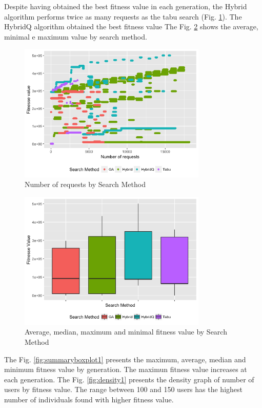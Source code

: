 Despite having obtained the best fitness value in each generation, the Hybrid algorithm performs twice as many requests as the  tabu search (Fig. \ref{fig:numberofrequestsbysearchmethod}). The HybridQ algorithm obtained the best fitness value The Fig. \ref{fig:boxplot1} shows the average, minimal e maximum value by search method.


\begin{figure}[H]

\centering
\includegraphics[width=0.8\textwidth]{./images/experiment1-3.png}
\caption{Number of requests by Search Method}
\label{fig:numberofrequestsbysearchmethod}
\end{figure}
\begin{figure}[H]
\centering
\includegraphics[width=0.8\textwidth]{./images/experiment1-4.png}
\caption{Average, median, maximum and minimal fitness value by Search Method}
\label{fig:boxplot1}

\end{figure}

The Fig. \ref{fig:summaryboxplot1} presents the maximum, average, median and minimum fitness value by generation. The maximun fitness value increases at each generation. The Fig. \ref{fig:density1} presents the density graph of number of users by fitness value. The range between 100 and 150 users has the highest number of individuals found with higher fitness value.

